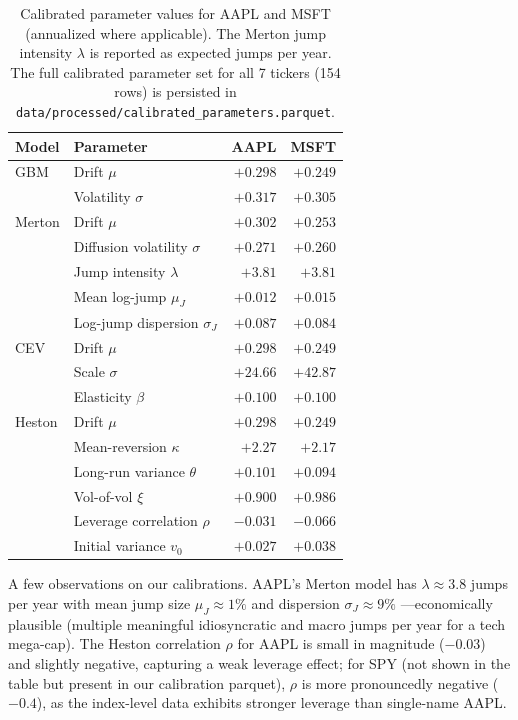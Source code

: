 \documentclass[11pt,letterpaper]{article}
\begin{document}
\begin{table}[!htbp]
\centering
\caption{Calibrated parameter values for AAPL and MSFT (annualized where applicable). The Merton jump intensity $\lambda$ is reported as expected jumps per year. The full calibrated parameter set for all 7 tickers (154 rows) is persisted in \texttt{data/processed/calibrated\_parameters.parquet}.}
\label{tab:calibration}
\small
\begin{tabular}{llrr}
\toprule
Model & Parameter & AAPL & MSFT \\
\midrule
GBM    & Drift $\mu$                    & $+0.298$ & $+0.249$ \\
       & Volatility $\sigma$            & $+0.317$ & $+0.305$ \\
\midrule
Merton & Drift $\mu$                    & $+0.302$ & $+0.253$ \\
       & Diffusion volatility $\sigma$  & $+0.271$ & $+0.260$ \\
       & Jump intensity $\lambda$       & $+3.81$  & $+3.81$  \\
       & Mean log-jump $\mu_J$          & $+0.012$ & $+0.015$ \\
       & Log-jump dispersion $\sigma_J$ & $+0.087$ & $+0.084$ \\
\midrule
CEV    & Drift $\mu$                    & $+0.298$ & $+0.249$ \\
       & Scale $\sigma$                 & $+24.66$ & $+42.87$ \\
       & Elasticity $\beta$             & $+0.100$ & $+0.100$ \\
\midrule
Heston & Drift $\mu$                    & $+0.298$ & $+0.249$ \\
       & Mean-reversion $\kappa$        & $+2.27$  & $+2.17$  \\
       & Long-run variance $\theta$     & $+0.101$ & $+0.094$ \\
       & Vol-of-vol $\xi$               & $+0.900$ & $+0.986$ \\
       & Leverage correlation $\rho$    & $-0.031$ & $-0.066$ \\
       & Initial variance $v_0$         & $+0.027$ & $+0.038$ \\
\bottomrule
\end{tabular}
\end{table}

A few observations on our calibrations. AAPL's Merton model has $\lambda \approx 3.8$ jumps per year with mean jump size $\mu_J \approx 1\%$ and dispersion $\sigma_J \approx 9\%$ —economically plausible (multiple meaningful idiosyncratic and macro jumps per year for a tech mega-cap). The Heston correlation $\rho$ for AAPL is small in magnitude ($-0.03$) and slightly negative, capturing a weak leverage effect; for SPY (not shown in the table but present in our calibration parquet), $\rho$ is more pronouncedly negative ($-0.4$), as the index-level data exhibits stronger leverage than single-name AAPL.
\end{document}
